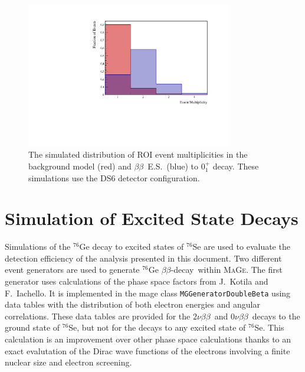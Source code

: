 \documentclass[notitlepage,rmp,aps,10pt]{revtex4-1}
\newcommand{\bb}{${\beta \beta}$}
\newcommand{\znbb}{${0 \nu \beta \beta}$}
\newcommand{\tnbb}{${2 \nu \beta \beta}$}
\newcommand{\bbes}{\bb~E.S.}
\newcommand{\Mage}{\textsc{MaGe}}
\newcommand{\iso}[2]{$^{#1}$#2}
\newcommand{\Ge}[1]{\iso{#1}{Ge}}
\newcommand{\Se}[1]{\iso{#1}{Se}}
\newcommand{\SP}[3]{$#1^{#2}_{#3}$}
\begin{document}
\begin{figure}[h]
  \centering
  \includegraphics[width=0.8\textwidth]{MultHist}
  \caption[Event Multiplicity in E.S. decay and BG model simulations]{\label{fig:multhist}
    The simulated distribution of ROI event multiplicities in the background model (red) and \bbes\ (blue) to \SP{0}{+}{1} decay. These simulations use the DS6 detector configuration.}
\end{figure}

\section{Simulation of Excited State Decays} \label{sec:essims}
Simulations of the \Ge{76} decay to excited states of \Se{76} are used to evaluate the detection efficiency of the analysis presented in this document.
Two different event generators are used to generate \Ge{76} \bb-decay\ within \Mage.
The first generator uses calculations of the phase space factors from J.~Kotila and F.~Iachello\cite{Kotila2012}.
It is implemented in the mage class \texttt{MGGeneratorDoubleBeta} using data tables with the distribution of both electron energies and angular correlations.
These data tables are provided for the \tnbb\ and \znbb\ decays to the ground state of \Se{76}, but not for the decays to any excited state of \Se{76}.
This calculation is an improvement over other phase space calculations thanks to an exact evalutation of the Dirac wave functions of the electrons involving a finite nuclear size and electron screening.
\end{document}
